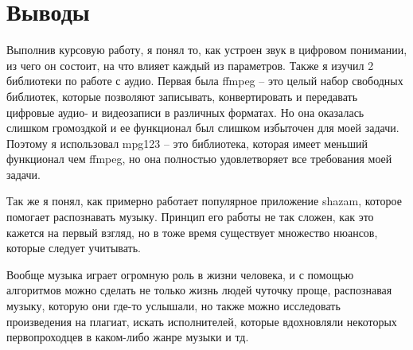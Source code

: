 \section{Выводы}

\par Выполнив курсовую работу, я понял то, как устроен звук в цифровом понимании, из чего он состоит, на что влияет каждый из параметров. Также я изучил 2 библиотеки по работе с аудио. Первая была ffmpeg -- это целый набор свободных библиотек, которые позволяют записывать, конвертировать и передавать цифровые аудио- и видеозаписи в различных форматах. Но она оказалась слишком громоздкой и ее функционал был слишком избыточен для моей задачи. Поэтому я использовал mpg123 -- это библиотека, которая имеет меньший функционал чем ffmpeg, но она полностью удовлетворяет все требования моей задачи.

Так же я понял, как примерно работает популярное приложение shazam, которое помогает распознавать музыку. Принцип его работы не так сложен, как это кажется на первый взгляд, но в тоже время существует множество нюансов, которые следует учитывать.

Вообще музыка играет огромную роль в жизни человека, и с помощью алгоритмов можно сделать не только жизнь людей чуточку проще, распознавая музыку, которую они где-то услышали, но также можно исследовать произведения на плагиат, искать исполнителей, которые вдохновляли некоторых первопроходцев в каком-либо жанре музыки и тд.


\pagebreak